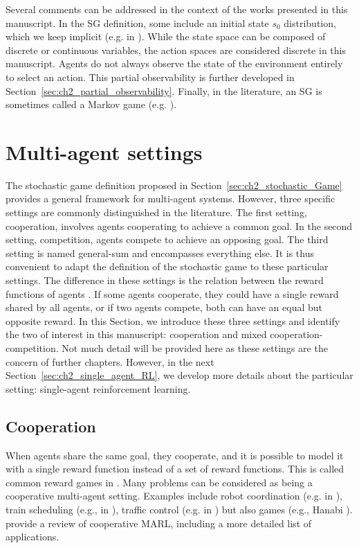 Several comments can be addressed in the context of the works presented in this manuscript.
In the SG definition, some include an initial state $s_0$ distribution, which we keep implicit (e.g. in \citep{marl-book}).
While the state space can be composed of discrete or continuous variables, the action spaces are considered discrete in this manuscript.
Agents do not always observe the state of the environment entirely to select an action.
This partial observability is further developed in Section~\ref{sec:ch2_partial_observability}.
Finally, in the literature, an SG is sometimes called a Markov game (e.g. \citep{MarkovGames}).

\section{Multi-agent settings} 
\label{sec:ch2_multi_agent_settings}
The stochastic game definition proposed in Section~\ref{sec:ch2_stochastic_Game} provides a general framework for multi-agent systems.
However, three specific settings are commonly distinguished in the literature.
The first setting, cooperation, involves agents cooperating to achieve a common goal.
In the second setting, competition, agents compete to achieve an opposing goal.
The third setting is named general-sum and encompasses everything else.
It is thus convenient to adapt the definition of the stochastic game to these particular settings.
The difference in these settings is the relation between the reward functions of agents \citep{marl-book}.
If some agents cooperate, they could have a single reward shared by all agents, or if two agents compete, both can have an equal but opposite reward.
In this Section, we introduce these three settings and identify the two of interest in this manuscript: cooperation and mixed cooperation-competition.
Not much detail will be provided here as these settings are the concern of further chapters.
However, in the next Section~\ref{sec:ch2_single_agent_RL}, we develop more details about the particular setting: single-agent reinforcement learning.

\subsection{Cooperation} 
\label{sec:ch2_Cooperation}
When agents share the same goal, they cooperate, and it is possible to model it with a single reward function instead of a set of reward functions.
This is called common reward games in \citep{marl-book}.
Many problems can be considered as being a cooperative multi-agent setting.
Examples include robot coordination (e.g. in \citep{papoudakis2021benchmarking}), train scheduling (e.g., in \citep{mohanty2020flatland}), traffic control (e.g. in \citep{zhang2019cityflow}) but also games (e.g., Hanabi \citep{Bard_2020}).
\citet{oroojlooy2022review} provide a review of cooperative MARL, including a more detailed list of applications.

